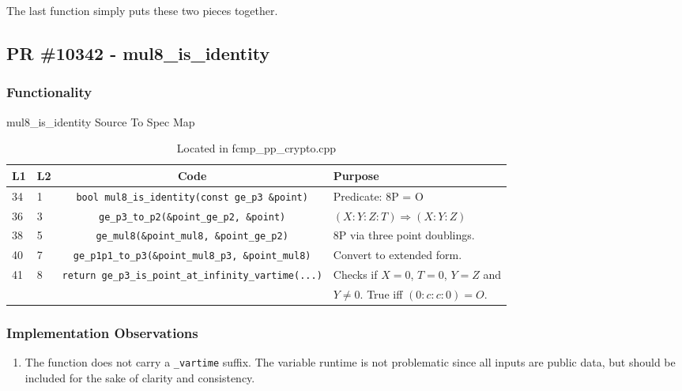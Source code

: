 \documentclass[12pt,titlepage,table]{article}
\begin{document}
\medskip
The last function simply puts these two pieces together. 

\newpage
\subsection{PR \#10342 - mul8\_is\_identity}
\subsubsection{Functionality}


\begin{table}[htbp]
\caption{mul8\_is\_identity Source To Spec Map}
\begin{adjustwidth}{-1in}{-1in}
\centering
{
\begin{tabular}{| l | l | c | l |}
\hline
\textbf{L1} & \textbf{L2} & \textbf{Code} & \textbf{Purpose} \\
\hline
34 & 1 & \verb+bool mul8_is_identity(const ge_p3 &point)+ & Predicate: 8P = O \\
36 & 3 & \verb+ge_p3_to_p2(&point_ge_p2, &point)+ & $(X:Y:Z:T) \Rightarrow (X:Y:Z)$\\
38 & 5 & \verb+ge_mul8(&point_mul8, &point_ge_p2)+ & 8P via three point doublings.\\
40 & 7 & \verb+ge_p1p1_to_p3(&point_mul8_p3, &point_mul8)+ & Convert to extended form. \\
41 & 8 & \verb+return ge_p3_is_point_at_infinity_vartime(...)+ & Checks if $X=0$, $T=0$, $Y=Z$ and \\
&&& $Y \neq 0$. True iff $(0:c:c:0) = O$. \\

\hline
\end{tabular}}
\end{adjustwidth}
\caption*{Located in fcmp\_pp\_crypto.cpp}
\end{table}
\subsubsection{Implementation Observations}
\begin{enumerate}
\item The function does not carry a \verb+_vartime+ suffix. The variable runtime is not problematic since all inputs are public data, but should be included for the sake of clarity and consistency.
\end{enumerate}
\newpage
\end{document}
